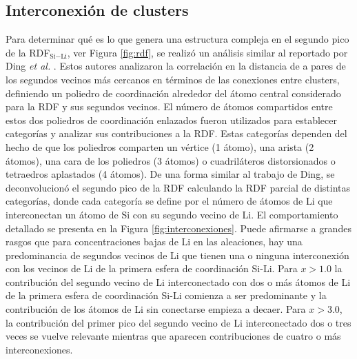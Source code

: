 \subsection{Interconexión de clusters}\label{s:interconexion}

Para determinar qué es lo que genera una estructura compleja en el segundo pico de la 
RDF$_{\text{Si}-\text{Li}}$, ver Figura \ref{fig:rdf}, se realizó un análisis similar al reportado por Ding \textit{et al.}
\cite{ding2015}. Estos autores analizaron la correlación en la distancia de a
pares de los segundos vecinos más cercanos en términos de las conexiones entre
clusters, definiendo un poliedro de coordinación alrededor del átomo central 
considerado para la RDF y sus segundos vecinos. El número de átomos compartidos
entre estos dos poliedros de coordinación enlazados fueron utilizados para 
establecer categorías y analizar sus contribuciones a la RDF. Estas categorías
dependen del hecho de que los poliedros comparten un vértice (1 átomo), una 
arista (2 átomos), una cara de los poliedros (3 átomos) o cuadriláteros 
distorsionados o tetraedros aplastados (4 átomos). De una forma similar al trabajo de Ding, se deconvolucionó el segundo pico de la RDF calculando la RDF parcial 
de distintas categorías, donde cada categoría se define por el número de átomos de
Li que interconectan un átomo de Si con su segundo vecino de Li. El comportamiento
detallado se presenta en la Figura \ref{fig:interconexiones}. Puede afirmarse a 
grandes rasgos que para concentraciones bajas de Li en las aleaciones, hay una 
predominancia de segundos vecinos de Li que tienen una o ninguna interconexión 
con los vecinos de Li de la primera esfera de coordinación Si-Li. Para $x > 1.0$
la contribución del segundo vecino de Li interconectado con dos o más átomos de 
Li de la primera esfera de coordinación Si-Li comienza a ser predominante y la
contribución de los átomos de Li sin conectarse empieza a decaer. Para $x > 3.0$,
la contribución del primer pico del segundo vecino de Li interconectado dos o
tres veces se vuelve relevante mientras que aparecen contribuciones de cuatro o
más interconexiones.
